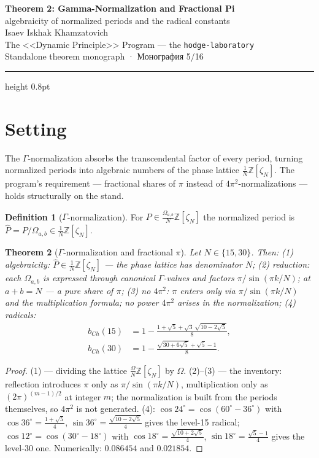 \documentclass[11pt,a4paper]{article}
\theoremstyle{plain}
\newtheorem{theorem}{Theorem}
\theoremstyle{definition}
\newtheorem{definition}[theorem]{Definition}
\theoremstyle{remark}
\newcommand{\ZZ}{\mathbb{Z}}
\newcommand{\Ga}{\Gamma}
\begin{document}
\begin{center}
{\LARGE\bfseries Theorem 2: Gamma-Normalization and Fractional Pi}\\[0.4em]
{\large algebraicity of normalized periods and the radical constants}\\[0.6em]
{\normalsize Isaev Iskhak Khamzatovich}\\[0.2em]
{\normalsize The <<Dynamic Principle>> Program --- the \texttt{hodge-laboratory}}\\[0.15em]
{\small Standalone theorem monograph · Монография 5/16}
\end{center}
\vspace{0.4em}
{\color{linkblue}\hrule height 0.8pt}
\vspace{0.8em}

\section{Setting}

The $\Ga$-normalization absorbs the transcendental factor of every
period, turning normalized periods into algebraic numbers of the
phase lattice $\frac1N\ZZ[\zeta_N]$. The program's requirement ---
fractional shares of $\pi$ instead of $4\pi^2$-normalizations ---
holds structurally on the stand.

\begin{definition}[$\Ga$-normalization]
For $P\in\frac{\Omega_{a,b}}{N}\ZZ[\zeta_N]$ the normalized period
is $\widehat{P}=P/\Omega_{a,b}\in\frac1N\ZZ[\zeta_N]$.
\end{definition}

\begin{theorem}[$\Ga$-normalization and fractional $\pi$]\label{th:norm}
Let $N\in\{15,30\}$. Then: (1) algebraicity:
$\widehat P\in\frac1N\ZZ[\zeta_N]$ --- the phase lattice has
denominator $N$; (2) reduction: each $\Omega_{a,b}$ is expressed
through canonical $\Ga$-values and factors $\pi/\sin(\pi k/N)$; at
$a+b=N$ --- a pure share of $\pi$; (3) no $4\pi^2$: $\pi$ enters
only via $\pi/\sin(\pi k/N)$ and the multiplication formula; no
power $4\pi^2$ arises in the normalization; (4) radicals:
\begin{align}
  b_{Ch}(15)&=1-\frac{1+\sqrt5+\sqrt3\,\sqrt{10-2\sqrt5}}{8},\\
  b_{Ch}(30)&=1-\frac{\sqrt{30+6\sqrt5}+\sqrt5-1}{8}.
\end{align}
\end{theorem}

\begin{proof}
(1) --- dividing the lattice $\frac{\Omega}N\ZZ[\zeta_N]$ by
$\Omega$. (2)--(3) --- the inventory: reflection introduces $\pi$
only as $\pi/\sin(\pi k/N)$, multiplication only as
$(2\pi)^{(m-1)/2}$ at integer $m$; the normalization is built from
the periods themselves, so $4\pi^2$ is not generated. (4):
$\cos24^\circ=\cos(60^\circ-36^\circ)$ with
$\cos36^\circ=\frac{1+\sqrt5}4$,
$\sin36^\circ=\frac{\sqrt{10-2\sqrt5}}4$ gives the level-15
radical; $\cos12^\circ=\cos(30^\circ-18^\circ)$ with
$\cos18^\circ=\frac{\sqrt{10+2\sqrt5}}4$,
$\sin18^\circ=\frac{\sqrt5-1}4$ gives the level-30 one.
Numerically: $0.086454$ and $0.021854$.
\end{proof}
\end{document}
